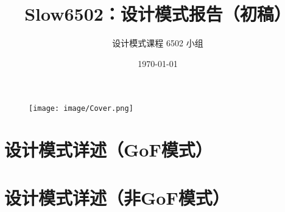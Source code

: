 \documentclass[cn,black,12pt,normal]{elegantnote}
\title{Slow6502：设计模式报告（初稿）}
\author{设计模式课程 6502 小组}
\institute{软件学院}
\date{\today}
\begin{document}
\maketitle

\begin{figure}[H]
    \centering
    \texttt{[image: image/Cover.png]}
\end{figure}



\newpage

\tableofcontents



\newpage

\section{设计模式详述（GoF模式）}
























\section{设计模式详述（非GoF模式）}










\newpage







\end{document}
